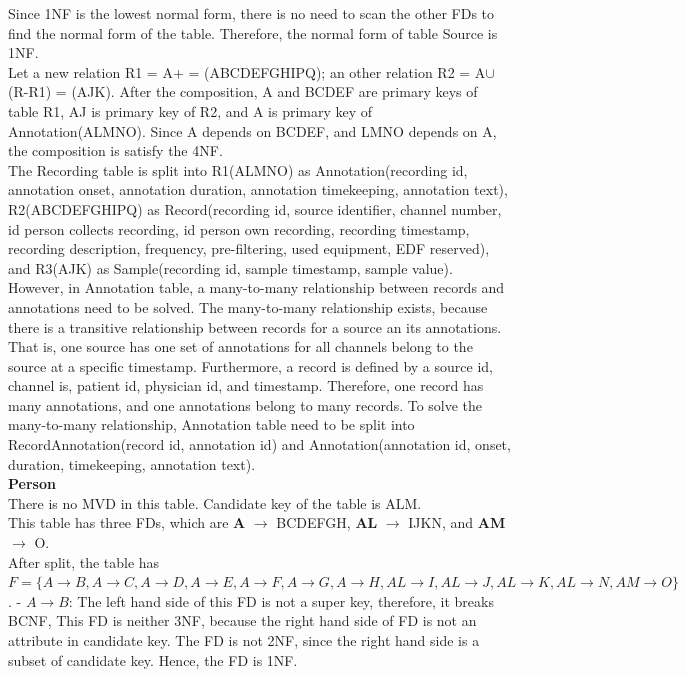 Since 1NF is the lowest normal form, there is no need to scan the other FDs to find the normal form of the table. Therefore, the normal form of table Source is 1NF.\\
Let a new relation R1 = A+ = (ABCDEFGHIPQ); an other relation R2 = A$\cup$(R-R1) = (AJK). After the composition, A and BCDEF are primary keys of table R1, AJ is primary key of R2, and A is primary key of Annotation(ALMNO). Since A depends on BCDEF, and LMNO depends on A, the composition is satisfy the 4NF.\\
The Recording table is split into R1(ALMNO) as Annotation(recording id, annotation onset, annotation duration, annotation timekeeping, annotation text), R2(ABCDEFGHIPQ) as Record(recording id, source identifier, channel number, id person collects recording, id person own recording, recording timestamp, recording description, frequency, pre-filtering, used equipment, EDF reserved), and R3(AJK) as Sample(recording id, sample timestamp, sample value).\\
However, in Annotation table, a many-to-many relationship between records and annotations need to be solved. The many-to-many relationship exists, because there is a transitive relationship between records for a source an its annotations. That is, one source has one set of annotations for all channels belong to the source at a specific timestamp. Furthermore, a record is defined by a source id, channel is, patient id, physician id, and timestamp. Therefore, one record has many annotations, and one annotations belong to many records. To solve the many-to-many relationship, Annotation table need to be split into RecordAnnotation(record id, annotation id) and Annotation(annotation id, onset, duration, timekeeping, annotation text).\\
\textbf{Person}\\
There is no MVD in this table. Candidate key of the table is ALM.\\
This table has three FDs, which are \textbf{A} $\rightarrow$ BCDEFGH, \textbf{AL} $\rightarrow$ IJKN, and \textbf{AM} $\rightarrow$ O.\\
After split, the table has $F=\{A \rightarrow B, A \rightarrow C, A \rightarrow D, A \rightarrow E, A \rightarrow F, A \rightarrow G, A \rightarrow H, AL \rightarrow I, AL \rightarrow J, AL \rightarrow K, AL \rightarrow N, AM \rightarrow O\}$.
- $A \rightarrow B$: The left hand side of this FD is not a super key, therefore, it breaks BCNF, This FD is neither 3NF, because the right hand side of FD is not an attribute in candidate key. The FD is not 2NF, since the right hand side is a subset of candidate key. Hence, the FD is 1NF.\\
